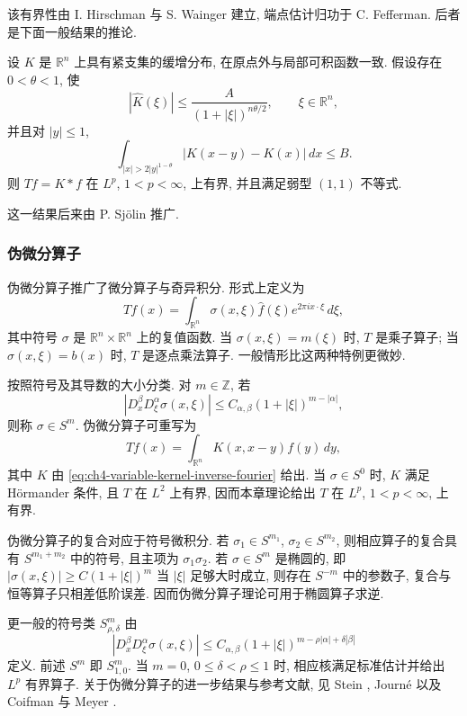 该有界性由 I. Hirschman 与 S. Wainger 建立, 端点估计归功于 C. Fefferman. 后者是下面一般结果的推论.

\hypertarget{chapter-05-page-125}{}
\begin{Theorem}
\label{thm:ch5-strongly-singular-general}
设 $K$ 是 $\mathbb R^n$ 上具有紧支集的缓增分布, 在原点外与局部可积函数一致. 假设存在 $0<\theta<1$, 使
\[
 |\widehat K(\xi)|\le\frac A{(1+|\xi|)^{n\theta/2}},
 \qquad \xi\in\mathbb R^n,
\]
并且对 $|y|\le1$,
\[
 \int_{|x|>2|y|^{1-\theta}}|K(x-y)-K(x)|\,dx\le B.
\]
则 $Tf=K*f$ 在 $L^p$, $1<p<\infty$, 上有界, 并且满足弱型 $(1,1)$ 不等式.
\end{Theorem}

这一结果后来由 P. Sjölin 推广.

\subsubsection{伪微分算子}
\label{subsec:ch5-pseudodifferential-operators}

伪微分算子推广了微分算子与奇异积分. 形式上定义为
\[
 Tf(x)=\int_{\mathbb R^n}\sigma(x,\xi)\widehat f(\xi)e^{2\pi ix\cdot\xi}\,d\xi,
\]
其中符号 $\sigma$ 是 $\mathbb R^n\times\mathbb R^n$ 上的复值函数. 当 $\sigma(x,\xi)=m(\xi)$ 时, $T$ 是乘子算子; 当 $\sigma(x,\xi)=b(x)$ 时, $T$ 是逐点乘法算子. 一般情形比这两种特例更微妙.

按照符号及其导数的大小分类. 对 $m\in\mathbb Z$, 若
\[
 |D_x^\beta D_\xi^\alpha\sigma(x,\xi)|
 \le C_{\alpha,\beta}(1+|\xi|)^{m-|\alpha|},
\]
则称 $\sigma\in S^m$. 伪微分算子可重写为
\begin{equation}
\label{eq:ch5-pseudodifferential-kernel-form}
 Tf(x)=\int_{\mathbb R^n}K(x,x-y)f(y)\,dy,
\end{equation}
其中 $K$ 由 \eqref{eq:ch4-variable-kernel-inverse-fourier} 给出. 当 $\sigma\in S^0$ 时, $K$ 满足 Hörmander 条件, 且 $T$ 在 $L^2$ 上有界, 因而本章理论给出 $T$ 在 $L^p$, $1<p<\infty$, 上有界.

\hypertarget{chapter-05-page-126}{}
伪微分算子的复合对应于符号微积分. 若 $\sigma_1\in S^{m_1}$, $\sigma_2\in S^{m_2}$, 则相应算子的复合具有 $S^{m_1+m_2}$ 中的符号, 且主项为 $\sigma_1\sigma_2$. 若 $\sigma\in S^m$ 是椭圆的, 即 $|\sigma(x,\xi)|\ge C(1+|\xi|)^m$ 当 $|\xi|$ 足够大时成立, 则存在 $S^{-m}$ 中的参数子, 复合与恒等算子只相差低阶误差. 因而伪微分算子理论可用于椭圆算子求逆.

更一般的符号类 $S_{\rho,\delta}^m$ 由
\[
 |D_x^\beta D_\xi^\alpha\sigma(x,\xi)|
 \le C_{\alpha,\beta}(1+|\xi|)^{m-\rho|\alpha|+\delta|\beta|}
\]
定义. 前述 $S^m$ 即 $S_{1,0}^m$. 当 $m=0$, $0\le\delta<\rho\le1$ 时, 相应核满足标准估计并给出 $L^p$ 有界算子. 关于伪微分算子的进一步结果与参考文献, 见 Stein , Journé  以及 Coifman 与 Meyer .
